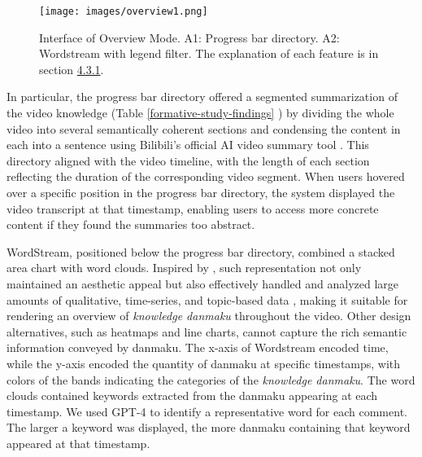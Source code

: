 \begin{figure*}[h]
  \centering
  \texttt{[image: images/overview1.png]}
  \caption{Interface of Overview Mode. A1: Progress bar directory. A2: Wordstream with legend filter. The explanation of each feature is in section \hyperref[overview-mode]{4.3.1}.}\label{fig:overview}
\end{figure*}

In particular, the progress bar directory offered a segmented summarization of the video knowledge (Table \ref{formative-study-findings} ) by dividing the whole video into several semantically coherent sections and condensing the content in each into a sentence using Bilibili's official AI video summary tool \cite{bilibili_video}.
This directory aligned with the video timeline,
with the length of each section reflecting the duration of the corresponding video segment. When users hovered over a specific position in the progress bar directory, the system displayed the video transcript at that timestamp, enabling users to access more concrete content if they found the summaries too abstract.

WordStream, positioned below the progress bar directory, combined a stacked area chart with word clouds. Inspired by \cite{heimerl2015citerivers, nguyen2022wordstream, liu2012tiara}, such representation not only maintained an aesthetic appeal \cite{heimerl2015citerivers} but also effectively handled and analyzed large amounts of qualitative, time-series, and topic-based data \cite{nguyen2022wordstream, liu2012tiara}, making it suitable for rendering an overview of \textit{knowledge danmaku} throughout the video. 
Other design alternatives, such as heatmaps and line charts, cannot capture the rich semantic information conveyed by danmaku.
The x-axis of Wordstream encoded time, while the y-axis encoded the quantity of danmaku at specific timestamps, with colors of the bands indicating the categories of the \textit{knowledge danmaku}. 
The word clouds contained keywords extracted from the danmaku appearing at each timestamp.
We used GPT-4 \cite{achiam2023gpt} to identify a representative word for each comment.  
The larger a keyword was displayed, the more danmaku containing that keyword appeared at that timestamp.

